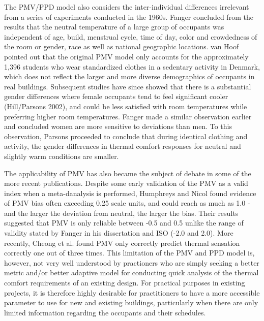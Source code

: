         The PMV/PPD model also considers the inter-individual differences irrelevant from a series of experiments conducted in the 1960s. Fanger concluded from the results that the neutral temperature of a large group of occupants was independent of age, build, menstrual cycle, time of day, color and crowdedness of the room or gender, race as well as national geographic locations\cite{fanger_thermal_1970}. van Hoof pointed out that the original PMV model only accounts for the approximately 1,396 students who wear standardized clothes in a sedentary activity in Denmark, which does not reflect the larger and more diverse demographics of occupants in real buildings\cite{van_hoof_quantifying_2007}. Subsequent studies have since showed that there is a substantial gender differences where female occupants tend to feel significant cooler (Hill/Parsons 2002), and could be less satisfied with room temperatures while preferring higher room temperatures. Fanger made a similar observation earlier and concluded women are more sensitive to deviations than men\cite{fanger_assessment_1973}. To this observation, Parsons proceeded to conclude that during identical clothing and activity, the gender differences in thermal comfort responses for neutral and slightly warm conditions are smaller.

        The applicability of PMV has also became the subject of debate in some of the more recent publications. Despite some early validation of the PMV as a valid index when a meta-danalysis is performed, Humphreys and Nicol\cite{humphreys_validity_2002} found evidence of PMV bias often exceeding 0.25 scale units, and could reach as much as 1.0 - and the larger the deviation from neutral, the larger the bias. Their results suggested that PMV is only reliable between -0.5 and 0.5 unlike the range of validity stated by Fanger in his dissertation \cite{fanger_calculation_1967} and ISO (-2.0 and 2.0). More recently,  Cheong et al. found PMV only correctly predict thermal sensation correctly one out of three times\cite{cheong_local_2007}. This limitation of the PMV and PPD model is, however, not very well understood by practioners who are simply seeking a better metric and/or better adaptive model for conducting quick analysis of the thermal comfort requirements of an existing design. For practical purposes in existing projects, it is therefore highly desirable for practitioners to have a more accessible parameter to use for new and existing buildings, particularly when there are only limited information regarding the occupants and their schedules. %

